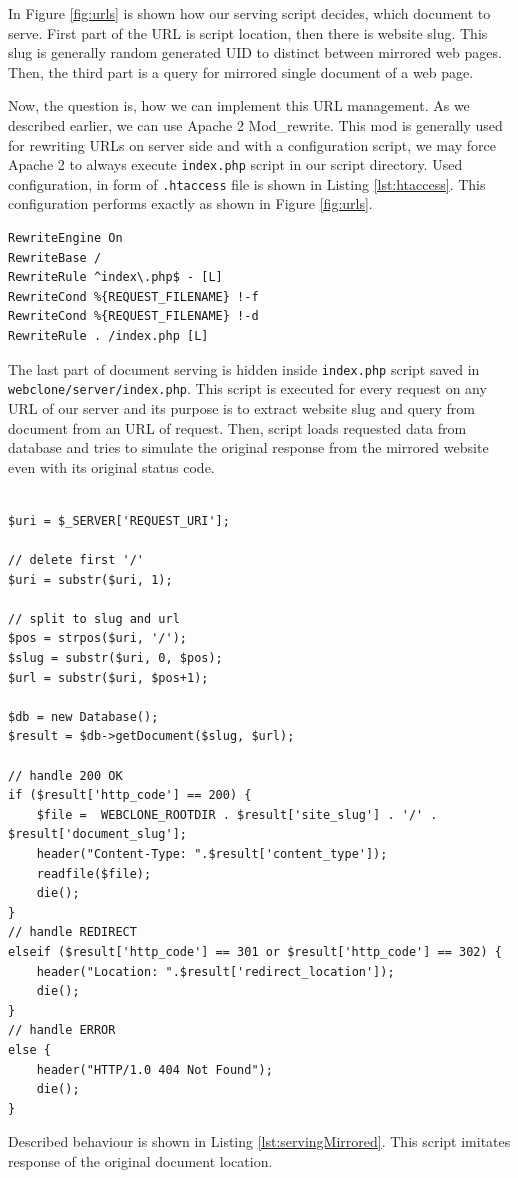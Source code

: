 In Figure \ref{fig:urls} is shown how our serving script decides, which document to serve. First part of the URL is script location, then there is website slug. This slug is generally random generated UID to distinct between mirrored web pages. Then, the third part is a query for mirrored single document of a web page.

Now, the question is, how we can implement this URL management. As we described earlier, we can use Apache 2 Mod\_rewrite. This mod is generally used for rewriting URLs on server side and with a configuration script, we may force Apache 2 to always execute \texttt{index.php} script in our script directory. Used configuration, in form of \texttt{.htaccess} file is shown in Listing \ref{lst:htaccess}. This configuration performs exactly as shown in Figure \ref{fig:urls}.

\begin{lstlisting}[caption={Example of .htaccess for Apache 2 mod\_rewrite},label={lst:htaccess}]
RewriteEngine On
RewriteBase /
RewriteRule ^index\.php$ - [L]
RewriteCond %{REQUEST_FILENAME} !-f
RewriteCond %{REQUEST_FILENAME} !-d
RewriteRule . /index.php [L]
\end{lstlisting}

The last part of document serving is hidden inside \texttt{index.php} script saved in \texttt{webclone/server/index.php}. This script is executed for every request on any URL of our server and its purpose is to extract website slug and query from document from an URL of request. Then, script loads requested data from database and tries to simulate the original response from the mirrored website even with its original status code.

\begin{lstlisting}[caption={Serving of mirrored documents},label={lst:servingMirrored}]

$uri = $_SERVER['REQUEST_URI'];

// delete first '/'
$uri = substr($uri, 1);

// split to slug and url
$pos = strpos($uri, '/');
$slug = substr($uri, 0, $pos);
$url = substr($uri, $pos+1);

$db = new Database();
$result = $db->getDocument($slug, $url);

// handle 200 OK
if ($result['http_code'] == 200) {
    $file =  WEBCLONE_ROOTDIR . $result['site_slug'] . '/' . $result['document_slug'];
    header("Content-Type: ".$result['content_type']);
    readfile($file);
    die();
} 
// handle REDIRECT
elseif ($result['http_code'] == 301 or $result['http_code'] == 302) {
    header("Location: ".$result['redirect_location']);
    die();
}
// handle ERROR
else {
    header("HTTP/1.0 404 Not Found");
    die();
}
\end{lstlisting}

Described behaviour is shown in Listing \ref{lst:servingMirrored}. This script imitates response of the original document location.